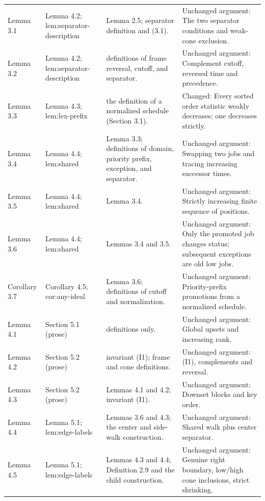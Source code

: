 {\begin{longtable}{@{}L{2.6cm}L{3.2cm}L{3.7cm}L{5.1cm}@{}}
Lemma 3.1 & Lemma 4.2; \textsf{lem:\allowbreak separator-\allowbreak description} & Lemma 2.5; separator definition and (3.1). & Unchanged argument: The two separator conditions and weak-cone exclusion.\\[3pt]
Lemma 3.2 & Lemma 4.2; \textsf{lem:\allowbreak separator-\allowbreak description} & definitions of frame reversal, cutoff, and separator. & Unchanged argument: Complement cutoff, reversed time and precedence.\\[3pt]
Lemma 3.3 & Lemma 4.3; \textsf{lem:\allowbreak lex-\allowbreak prefix} & the definition of a normalized schedule (Section 3.1). & Changed: Every sorted order statistic weakly decreases; one decreases strictly.\\[3pt]
Lemma 3.4 & Lemma 4.4; \textsf{lem:\allowbreak shared} & Lemma 3.3; definitions of domain, priority prefix, exception, and separator. & Unchanged argument: Swapping two jobs and tracing increasing successor times.\\[3pt]
Lemma 3.5 & Lemma 4.4; \textsf{lem:\allowbreak shared} & Lemma 3.4. & Unchanged argument: Strictly increasing finite sequence of positions.\\[3pt]
Lemma 3.6 & Lemma 4.4; \textsf{lem:\allowbreak shared} & Lemmas 3.4 and 3.5. & Unchanged argument: Only the promoted job changes status; subsequent exceptions are old low jobs.\\[3pt]
Corollary 3.7 & Corollary 4.5; \textsf{cor:\allowbreak any-\allowbreak ideal} & Lemma 3.6; definitions of cutoff and normalization. & Unchanged argument: Priority-prefix promotions from a normalized schedule.\\[3pt]
Lemma 4.1 & Section 5.1 (prose) & definitions only. & Unchanged argument: Global upsets and increasing rank.\\[3pt]
Lemma 4.2 & Section 5.2 (prose) & invariant (I1); frame and cone definitions. & Unchanged argument: (I1), complements and reversal.\\[3pt]
Lemma 4.3 & Section 5.2 (prose) & Lemmas 4.1 and 4.2; invariant (I1). & Unchanged argument: Downset blocks and key order.\\[3pt]
Lemma 4.4 & Lemma 5.1; \textsf{lem:\allowbreak edge-\allowbreak labels} & Lemmas 3.6 and 4.3; the center and side-walk construction. & Unchanged argument: Shared walk plus center separator.\\[3pt]
Lemma 4.5 & Lemma 5.1; \textsf{lem:\allowbreak edge-\allowbreak labels} & Lemmas 4.3 and 4.4; Definition 2.9 and the child construction. & Unchanged argument: Genuine right boundary, low/high cone inclusions, strict shrinking.\\[3pt]

\end{longtable}}
